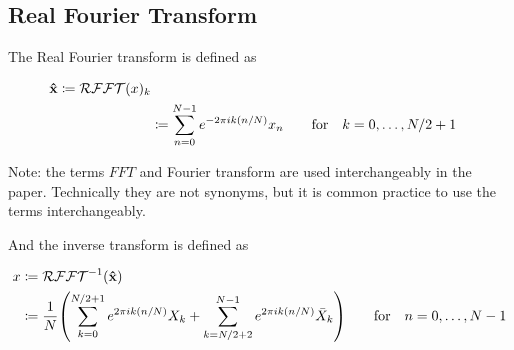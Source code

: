 \subsection*{Real Fourier Transform}

The Real Fourier transform is defined as

\begin{align*}
  \mathbf{\hat{x}} \coloneqq \mathcal{RFFT}(x)_k\\
  & \coloneqq \sum_{n=0}^{N-1} e^{-2\pi i k (n/N)} x_n \qquad \text{for} \quad k = 0, \dotsc, N/2+1
\end{align*}

Note: the terms $FFT$ and Fourier transform are used interchangeably in the paper. Technically they are not synonyms, but it is common practice to use the terms interchangeably.

And the inverse transform is defined as

\begin{align*}
  x& \coloneqq \mathcal{RFFT}^{-1}(\bhat{x})\\
  & \coloneqq \frac{1}{N} \paren{\sum_{k=0}^{N/2+1} e^{2\pi i k (n/N)} X_k + \sum_{k=N/2+2}^{N-1} e^{2\pi i k (n/N)} \bar{X}_k} \qquad \text{for} \quad n = 0, \dotsc, N-1
\end{align*}